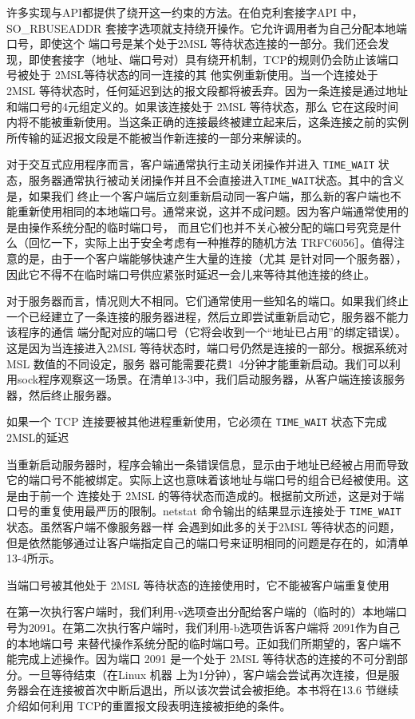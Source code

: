 许多实现与API都提供了绕开这一约束的方法。在伯克利套接字API 中，SO\_RBUSEADDR
套接字选项就支持绕开操作。它允许调用者为自己分配本地端口号，即使这个
端口号是某个处于2MSL 等待状态连接的一部分。我们还会发现，即使套接字（地址、端口号对）具有绕开机制，TCP的规则仍会防止该端口号被处于
2MSL等待状态的同一连接的其
他实例重新使用。当一个连接处于 2MSL
等待状态时，任何延迟到达的报文段都将被丢弃。因为一条连接是通过地址和端口号的4元组定义的。如果该连接处于 2MSL 等待状态，那么
它在这段时间内将不能被重新使用。当这条正确的连接最终被建立起来后，这条连接之前的实例所传输的延迟报文段是不能被当作新连接的一部分来解读的。

对于交互式应用程序而言，客户端通常执行主动关闭操作并进入 \verb|TIME_WAIT|
状态，服务器通常执行被动关闭操作并且不会直接进入\verb|TIME_WAIT|状态。其中的含义是，如果我们
终止一个客户端后立刻重新启动同一客户端，那么新的客户端也不能重新使用相同的本地端口号。通常来说，这并不成问题。因为客户端通常使用的是由操作系统分配的临时端口号，
而且它们也并不关心被分配的端口号究竞是什么（回忆一下，实际上出于安全考虑有一种推荐的随机方法
TRFC6056］。值得注意的是，由于一个客户端能够快速产生大量的连接（尤其
是针对同一个服务器），因此它不得不在临时端口号供应紧张时延迟一会儿来等待其他连接的终止。

对于服务器而言，情况则大不相同。它们通常使用一些知名的端口。如果我们终止一个已经建立了一条连接的服务器进程，然后立即尝试重新启动它，服务器不能力该程序的通信
端分配对应的端口号（它将会收到一个“地址已占用”的绑定错误）。这是因为当连接进入2MSL 等待状态时，端口号仍然是连接的一部分。根据系统对
MSL 数值的不同设定，服务
器可能需要花费1~4分钟才能重新启动。我们可以利用sock程序观察这一场景。在清单13-3中，我们启动服务器，从客户端连接该服务器，然后终止服务器。

如果一个 TCP 连接要被其他进程重新使用，它必须在 \verb|TIME_WAIT| 状态下完成 2MSL的延迟

当重新启动服务器时，程序会输出一条错误信息，显示由于地址已经被占用而导致它的端口号不能被绑定。实际上这也意味着该地址与端口号的组合已经被使用。这是由于前一个
连接处于 2MSL 的等待状态而造成的。根据前文所述，这是对于端口号的重复使用最严历的限制。netstat 命令输出的结果显示连接处于
\verb|TIME_WAIT| 状态。虽然客户端不像服务器一样
会遇到如此多的关于2MSL 等待状态的问题，但是依然能够通过让客户端指定自己的端口号来证明相同的问题是存在的，如清单13-4所示。

当端口号被其他处于 2MSL 等待状态的连接使用时，它不能被客户端重复使用

在第一次执行客户端时，我们利用-v选项查出分配给客户端的（临时的）本地端口号为2091。在第二次执行客户端时，我们利用-b选项告诉客户端将
2091作为自己的本地端口号
来替代操作系统分配的临时端口号。正如我们所期望的，客户端不能完成上述操作。因为端口 2091 是一个处于 2MSL
等待状态的连接的不可分割部分。一旦等待结束（在Linux 机器
上为1分钟），客户端会尝试再次连接，但是服务器会在连接被首次中断后退出，所以该次尝试会被拒绝。本书将在13.6 节继续介绍如何利用
TCP的重置报文段表明连接被拒绝的条件。

